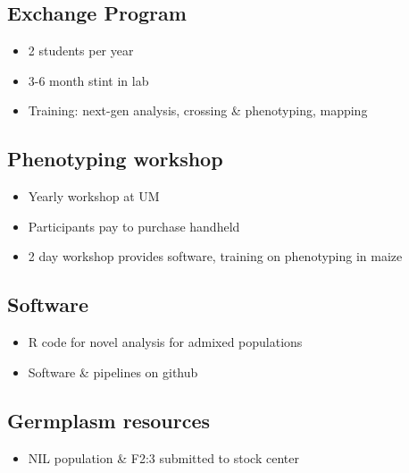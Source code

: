 \documentclass[]{article}
\begin{document}
\subsection{Exchange Program}
\begin{itemize}
\item 2 students per year
\item 3-6 month stint in lab
\item Training: next-gen analysis, crossing \& phenotyping, mapping
\end{itemize}

\subsection{Phenotyping workshop}
\begin{itemize}
\item Yearly workshop at UM
\item Participants pay to purchase handheld
\item 2 day workshop provides software, training on phenotyping in maize
\end{itemize}

\subsection{Software}
\begin{itemize}
\item R code for novel analysis for admixed populations
\item Software \& pipelines on github
\end{itemize}

\subsection{Germplasm resources}
\begin{itemize}
\item NIL population \& F2:3 submitted to stock center
\end{itemize}
\end{document}
